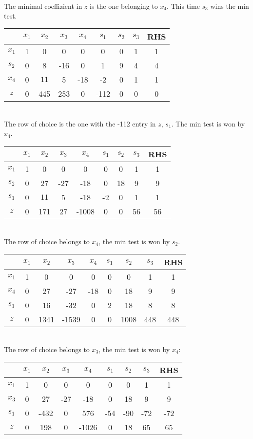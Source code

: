 \documentclass[a4paper,12pt,headsepline]{scrartcl}
\begin{document}
The minimal coeffizient in $z$ is the one belonging to $x_4$. This time $s_3$ wins the min test.\\
\begin{tabular}{c|c|c|c|c|c|c|c|c|}
     & $x_1$ & $x_2$ & $x_3$ & $x_4$ & $s_1$ & $s_2$ & $s_3$ & RHS  \\
\hline   $x_1$ & 1& 0 &0 & 0 & 0&0 & 1 & 1\\
\hline $s_2$ & 0 & 8 & -16 & 0 &1 & 9 & 4 & 4\\
\hline $x_4$ & 0 & $11$ &5 &-18 &-2 & 0&1 & 1\\
\hline \hline $z$ & 0 & 445 & 253 & 0 & -112 & 0 & 0 & 0\\
\hline 
\end{tabular}\\ 
The row of choice is the one with the -112 entry in $z$, $s_1$. The min test is won by $x_4$.\\
\begin{tabular}{c|c|c|c|c|c|c|c|c|}
     & $x_1$ & $x_2$ & $x_3$ & $x_4$ & $s_1$ & $s_2$ & $s_3$ & RHS  \\
\hline   $x_1$ & 1& 0 &0 & 0 & 0&0 & 1 & 1\\
\hline $s_2$ & 0 & 27 & -27 & -18 &0 & 18 & 9 & 9\\
\hline $s_1$ & 0 & $11$ &5 &-18 &-2 & 0 & 1 & 1\\
\hline \hline $z$ & 0 & 171 & 27 & -1008 & 0 & 0 & 56 & 56\\
\hline 
\end{tabular}\\
The row of choice belongs to $x_4$, the min test is won by $s_2$.\\
\begin{tabular}{c|c|c|c|c|c|c|c|c|}
     & $x_1$ & $x_2$ & $x_3$ & $x_4$ & $s_1$ & $s_2$ & $s_3$ & RHS  \\
\hline   $x_1$ & 1& 0 &0 & 0 & 0&0 & 1 & 1\\
\hline $x_4$ & 0 & 27 & -27 & -18 &0 & 18 & 9 & 9\\
\hline $s_1$ & 0 & 16 &-32 &0 & 2 & 18 & 8 & 8\\
\hline \hline $z$ & 0 & 1341 & -1539 & 0 & 0 & 1008 & 448 & 448\\
\hline 
\end{tabular}\\
The row of choice belongs to $x_3$, the min test is won by $x_4$:\\
\begin{tabular}{c|c|c|c|c|c|c|c|c|}
     & $x_1$ & $x_2$ & $x_3$ & $x_4$ & $s_1$ & $s_2$ & $s_3$ & RHS  \\
\hline   $x_1$ & 1& 0 &0 & 0 & 0&0 & 1 & 1\\
\hline $x_3$ & 0 & 27 & -27 & -18 &0 & 18 & 9 & 9\\
\hline $s_1$ & 0 & -432 &0 &576 & -54 & -90 & -72 & -72\\
\hline \hline $z$ & 0 & 198 & 0 & -1026 & 0 & 18 & 65 & 65\\
\hline 
\end{tabular}\\
\end{document}
